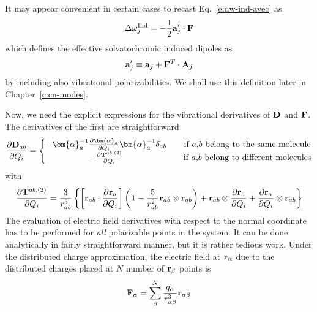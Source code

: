 \documentclass[a4paper,titlepage,twoside,fleqn,12pt]{book}
\newcommand{\BM}[1]{\bm{#1}}
\newcommand{\fderiv}[2]{\ensuremath{
    \frac{\partial #1}{\partial #2}}}
\begin{document}
\begin{refsection}
It may appear convenient in certain cases
to recast Eq.~\eqref{e:dw-ind-avec} as
%
\begin{equation}\label{e:dw-ind-avec-alternative}
\Delta\omega_j^{\rm Ind} = - \frac{1}{2}   {\bf a}_j' \cdot {\bf F} 
\end{equation}
%
which defines the effective solvatochromic induced dipoles as 
%
\begin{equation}\label{e:avec-prime}
{\bf a}_j' \equiv {\bf a}_j + {\bf F}^T \cdot {\bf A}_j
\end{equation}
% 
by including also vibrational polarizabilities. We shall use this definition
later in Chapter~\ref{c:cn-modes}.

Now, we need the explicit expressions for the vibrational
derivatives of $\bf D$ and $\bf F$. The derivatives of the first are straightforward
%
\begin{equation}
\fderiv{{\bf D}_{ab}}{Q_i} = 
\left\{\begin{matrix}               
-{\BM \alpha}_a^{-1} \fderiv{{\BM \alpha}_a}{Q_i} {\BM \alpha}_a^{-1} 
                       \delta_{ab} && \text{if $a$,$b$ belong to the same molecule} \\
-\fderiv{{\bf T}^{ab,(2)}}{Q_i}  && \text{if $a$,$b$ belong to different molecules}
\end{matrix}\right. 
\end{equation}
%
with
%
\begin{equation}
\fderiv{{\bf T}^{ab,(2)}}{Q_i} = \frac{3}{r_{ab}^5} 
       \left\{ 
           \left[ 
                {\bf r}_{ab} \cdot \fderiv{{\bf r}_{a}}{Q_i} 
           \right]
           \left(
                 {\bf 1} -
                 \frac{5}{r_{ab}^2} {\bf r}_{ab} \otimes {\bf r}_{ab} 
           \right) +
                 {\bf r}_{ab} \otimes \fderiv{{\bf r}_{a}}{Q_i} + \fderiv{{\bf r}_{a}}{Q_i} \otimes {\bf r}_{ab}
       \right\}
\end{equation}
%
The evaluation of electric field derivatives with respect to the normal coordinate 
has to be performed for \emph{all} polarizable points in the system. 
It can be done analytically
in fairly straightforward manner, but it is rather tedious work. 
Under the distributed charge approximation, 
the electric field at ${\bf r}_\alpha$ due to the 
distributed charges placed at $N$ number of ${\bf r}_\beta$ points is
%
\begin{equation}
{\bf F}_\alpha = \sum_\beta^N \frac{q_\alpha}{r_{\alpha\beta}^3} {\bf r}_{\alpha\beta}
\end{equation}

\end{refsection}
\end{document}
